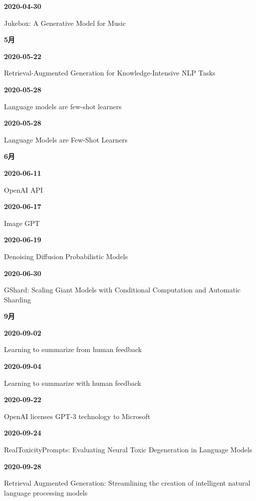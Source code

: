 \smallskip
\noindent\textbf{2020-04-30}\par
{\raggedright Jukebox: A Generative Model for Music\par}
\smallskip
\medskip
\noindent\textbf{5月}\par
\smallskip
\noindent\textbf{2020-05-22}\par
{\raggedright Retrieval-Augmented Generation for Knowledge-Intensive NLP Tasks\par}
\smallskip
\noindent\textbf{2020-05-28}\par
{\raggedright Language models are few-shot learners\par}
\smallskip
\noindent\textbf{2020-05-28}\par
{\raggedright Language Models are Few-Shot Learners\par}
\smallskip
\medskip
\noindent\textbf{6月}\par
\smallskip
\noindent\textbf{2020-06-11}\par
{\raggedright OpenAI API\par}
\smallskip
\noindent\textbf{2020-06-17}\par
{\raggedright Image GPT\par}
\smallskip
\noindent\textbf{2020-06-19}\par
{\raggedright Denoising Diffusion Probabilistic Models\par}
\smallskip
\noindent\textbf{2020-06-30}\par
{\raggedright GShard: Scaling Giant Models with Conditional Computation and Automatic Sharding\par}
\smallskip
\medskip
\noindent\textbf{9月}\par
\smallskip
\noindent\textbf{2020-09-02}\par
{\raggedright Learning to summarize from human feedback\par}
\smallskip
\noindent\textbf{2020-09-04}\par
{\raggedright Learning to summarize with human feedback\par}
\smallskip
\noindent\textbf{2020-09-22}\par
{\raggedright OpenAI licenses GPT-3 technology to Microsoft\par}
\smallskip
\noindent\textbf{2020-09-24}\par
{\raggedright RealToxicityPrompts: Evaluating Neural Toxic Degeneration in Language Models\par}
\smallskip
\noindent\textbf{2020-09-28}\par
{\raggedright Retrieval Augmented Generation: Streamlining the creation of intelligent natural language processing models\par}
